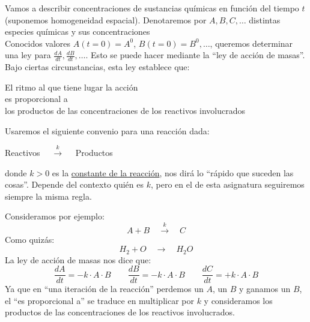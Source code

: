 \noindent
Vamos a describir concentraciones de sustancias químicas en función del tiempo $t$ (suponemos homogeneidad espacial). Denotaremos por $A,B,C,\ldots$ distintas especies químicas y sus concentraciones\\

\noindent
Conocidos valores $A(t=0)=A^0$, $B(t=0)=B^0, \ldots$, queremos determinar una ley para $\frac{dA}{dt}, \frac{dB}{dt}, \ldots$. Esto se puede hacer mediante la ``ley de acción de masas''. Bajo ciertas circunstancias, esta ley establece que:
\begin{center}
    El ritmo al que tiene lugar la acción \\
    es proporcional a \\
    los productos de las concentraciones de los reactivos involucrados
\end{center}

\begin{notacion}
    Usaremos el siguiente convenio para una reacción dada:
    \begin{center}
        Reactivos $\quad \stackrel{k}{\longrightarrow}\quad $ Productos
    \end{center}
    donde $k>0$ es la \underline{constante de la reacción}, nos dirá lo ``rápido que suceden las cosas''. Depende del contexto quién es $k$, pero en el de esta asignatura seguiremos siempre la misma regla.
\end{notacion}

\begin{ejemplo}
    Consideramos por ejemplo:
    \begin{equation*}
        A+B \quad \stackrel{k}{\longrightarrow}\quad C
    \end{equation*}
    Como quizás:
    \begin{equation*}
        H_2+O \quad \stackrel{}{\longrightarrow}\quad H_2O
    \end{equation*}
    La ley de acción de masas nos dice que:
    \begin{equation*}
        \frac{dA}{dt} = -k\cdot A\cdot B\qquad 
        \frac{dB}{dt} = -k\cdot A\cdot B\qquad 
        \frac{dC}{dt} = +k\cdot A\cdot B
    \end{equation*}
    Ya que en ``una iteración de la reacción'' perdemos un $A$, un $B$ y ganamos un $B$, el ``es proporcional a'' se traduce en multiplicar por $k$ y consideramos los productos de las concentraciones de los reactivos involucrados.
\end{ejemplo}

